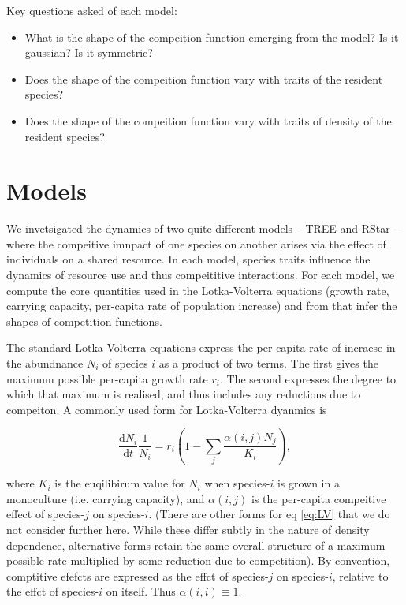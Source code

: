 \documentclass[a4paper,11pt]{article}
\newcommand{\ud}{\ensuremath{\mathrm{d}}}
\begin{document}
Key questions asked of each model:

\begin{itemize}
\item What is the shape of the compeition function emerging from the
  model? Is it gaussian? Is it symmetric?
\item Does the shape of the compeition function vary with traits of
  the resident species?
\item Does the shape of the compeition function vary with traits of
  density of the resident species?
\end{itemize}

\section{Models}


We invetsigated the dynamics of two quite different models -- TREE and RStar
-- where the compeitive imnpact of one species on another arises via the
effect of individuals on a shared resource. In each model, species traits
influence the dynamics of resource use and thus compeititive interactions. For
each model, we compute the core quantities used in the Lotka-Volterra
equations (growth rate, carrying capacity,  per-capita rate of population
increase) and from that infer the shapes of competition functions.

The standard Lotka-Volterra equations express the per capita rate of incraese
in the abundnance $N_i$ of species $i$ as a product of two terms. The first
gives the maximum possible per-capita growth rate $r_i$. The second expresses
the degree to which that maximum is realised, and thus includes any reductions
due to compeiton. A commonly used form for Lotka-Volterra dyanmics is

\begin{equation}
\label{eq:LV}
\frac{\ud N_i}{\ud t} \frac{1}{N_i} =  r_i \left(1 - \sum_j
                                      \frac{\alpha(i,j) N_j}{K_i}\right),
\end{equation}

where $K_i$ is the euqilibirum value for $N_i$ when species-$i$ is grown in a
monoculture  (i.e. carrying capacity), and $\alpha(i,j)$ is the per-capita
compeitive effect of species-$j$ on species-$i$. (There are other forms for eq
\ref{eq:LV} that we do not consider further here. While these differ subtly in
the nature of density dependence, alternative forms retain the same overall
structure of a maximum possible rate multiplied by some reduction due to
competition). By convention, comptitive efefcts are expressed as the effct of
species-$j$ on species-$i$, relative to the effct of species-$i$ on itself.
Thus $\alpha(i, i) \equiv 1$.
\end{document}
